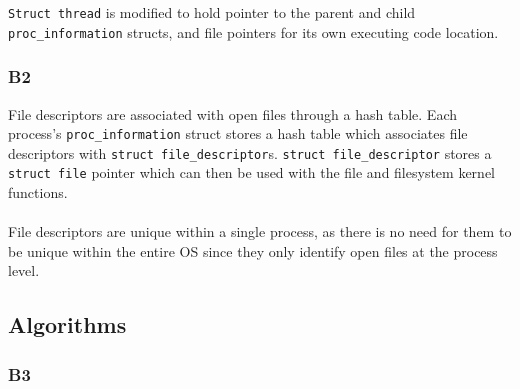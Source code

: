 \documentclass[a4wide, 11pt]{article}
\newcommand{\tx}{\texttt}
\begin{document}
\tx{Struct thread} is modified to hold pointer to the parent and child \tx{proc\_information} structs, and file pointers for its own executing code location.

\subsubsection{B2}

File descriptors are associated with open files through a hash table. Each process's \tx{proc\_information} struct stores a hash table which associates file descriptors with \tx{struct file\_descriptor}s. \tx{struct file\_descriptor} stores a \tx{struct file} pointer which can then be used with the file and filesystem kernel functions.
\\\\
File descriptors are unique within a single process, as there is no need for them to be unique within the entire OS since they only identify open files at the process level.

\subsection{Algorithms}
\subsubsection{B3}
\end{document}
